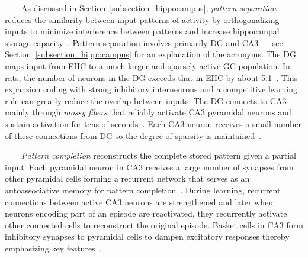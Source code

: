 \documentclass[letterpaper,11pt]{article}
\def\emdash{---}
\begin{document}






\begin{center}
  \begin{tcolorbox}[breakable,sharp corners=all,coltitle=black,colbacktitle=white,
    width=\textwidth,boxsep=5pt,left=5pt,right=5pt,
    title={\textbf{Box A: Pattern Separation, Completion and Integration}}]

~~~~As discussed in Section~\ref{subsection_hippocampus}, {\it{pattern separation}} reduces the similarity between input patterns of activity by orthogonalizing inputs to minimize interference between patterns and increase hippocampal storage capacity~\cite{KesnerandRollsNBR-15}. Pattern separation involves primarily DG and CA3 {\emdash{}} see Section~\ref{subsection_hippocampus} for an explanation of the acronyms. The DG maps input from EHC to a much larger and sparsely active GC population. In rats, the number of neurons in the DG exceeds that in EHC by about 5:1~\cite{DrewetalLEARNING-MEMORY-13}. This expansion coding with strong inhibitory interneurons and a competitive learning rule can greatly reduce the overlap between inputs. The DG connects to CA3 mainly through {\it{mossy fibers}} that reliably activate CA3 pyramidal neurons and sustain activation for tens of seconds~\cite{VyletaetalELIFE-16}. Each CA3 neuron receives a small number of these connections from DG so the degree of sparsity is maintained~\cite{KesnerandRollsNBR-15}.

~~~~{\it{Pattern completion}} reconstructs the complete stored pattern given a partial input. Each pyramidal neuron in CA3 receives a large number of synapses from other pyramidal cells forming a recurrent network that serves as an autoassociative memory for pattern completion~\cite{KesnerandRollsNBR-15}. During learning, recurrent connections between active CA3 neurons are strengthened and later when neurons encoding part of an episode are reactivated, they recurrently activate other connected cells to reconstruct the original episode. Basket cells in CA3 form inhibitory synapses to pyramidal cells to dampen excitatory responses thereby emphasizing key features~\cite{NeunuebelandKnierimNEURON-14}. 


\end{tcolorbox}
\end{center}
\end{document}
